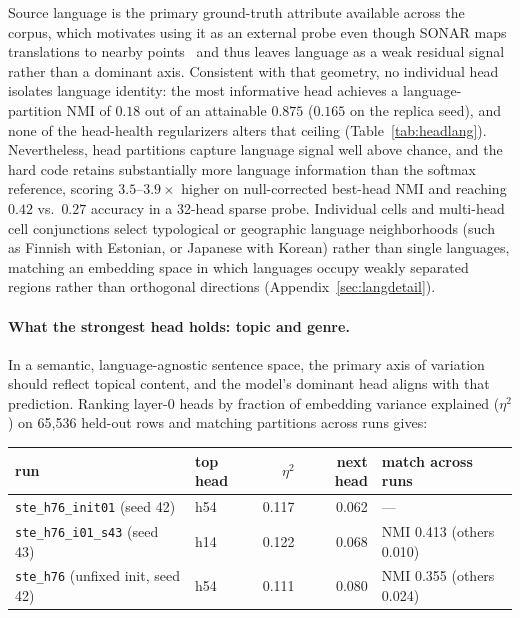 Source language is the primary ground-truth attribute available across the
corpus, which motivates using it as an external probe even though SONAR maps
translations to nearby points~\cite{sonar} and thus leaves language as a
weak residual signal rather than a dominant axis. Consistent with that
geometry, no individual head isolates language identity: the most
informative head achieves a language-partition NMI of $0.18$ out of an
attainable $0.875$ ($0.165$ on the replica seed), and none of the
head-health regularizers alters that ceiling (Table~\ref{tab:headlang}).
Nevertheless, head partitions capture language signal well above chance, and
the hard code retains substantially more language information than the
softmax reference, scoring $3.5$--$3.9\times$ higher on null-corrected
best-head NMI and reaching $0.42$ vs.\ $0.27$ accuracy in a 32-head sparse
probe. Individual cells and multi-head cell conjunctions select typological
or geographic language neighborhoods (such as Finnish with Estonian, or
Japanese with Korean) rather than single languages, matching an embedding
space in which languages occupy weakly separated regions rather than
orthogonal directions (Appendix~\ref{sec:langdetail}).

\paragraph{What the strongest head holds: topic and genre.} In a semantic,
language-agnostic sentence space, the primary axis of variation should
reflect topical content, and the model's dominant head aligns with that
prediction. Ranking layer-0 heads by fraction of embedding variance
explained ($\eta^2$) on 65{,}536 held-out rows and matching partitions
across runs gives:

\begin{center}\small\setlength{\tabcolsep}{4pt}
\begin{tabular}{@{}llrrl@{}}
\toprule
run & top head & $\eta^2$ & next head & match across runs \\
\midrule
\texttt{ste\_h76\_init01} (seed 42) & h54 & 0.117 & 0.062 & --- \\
\texttt{ste\_h76\_i01\_s43} (seed 43) & h14 & 0.122 & 0.068 & NMI 0.413 (others 0.010) \\
\texttt{ste\_h76} (unfixed init, seed 42) & h54 & 0.111 & 0.080 & NMI 0.355 (others 0.024) \\
\bottomrule
\end{tabular}
\end{center}


